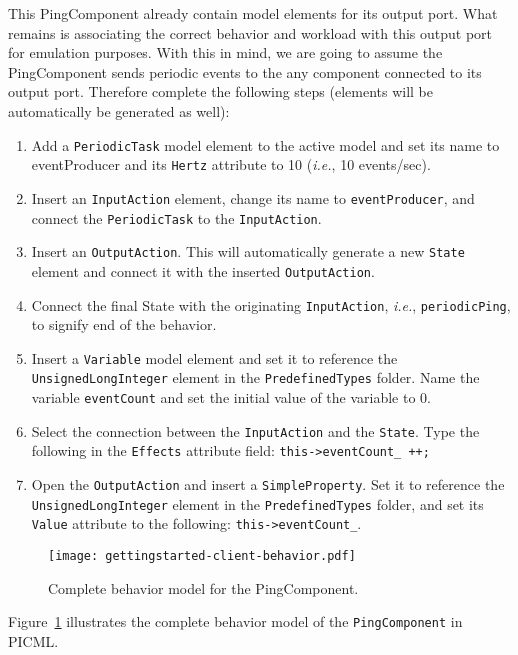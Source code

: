 This PingComponent already contain model elements for its output 
port. What remains is associating the correct behavior and workload 
with this output port for emulation purposes. With this in mind, 
we are going to assume the PingComponent sends periodic events to 
the any component connected to its output port. Therefore complete 
the following steps (elements will be automatically be generated 
as well):
\begin{enumerate}
  \item Add a \texttt{PeriodicTask} model element to the active model 
  and set its name to eventProducer and its \texttt{Hertz} attribute 
  to 10 (\textit{i.e.}, 10 events/sec).
    
  \item Insert an \texttt{InputAction} element, change its name to 
  \texttt{eventProducer}, and connect the \texttt{PeriodicTask} to 
  the \texttt{InputAction}.
    
  \item Insert an \texttt{OutputAction}. This will automatically 
  generate a new \texttt{State} element and connect it with the 
  inserted \texttt{OutputAction}.
    
  \item Connect the final State with the originating \texttt{InputAction}, 
  \textit{i.e.}, \texttt{periodicPing}, to signify end of the behavior.
    
  \item Insert a \texttt{Variable} model element and set it to reference 
  the \texttt{UnsignedLongInteger} element in the \texttt{PredefinedTypes} 
  folder. Name the variable \texttt{eventCount} and set the initial value 
  of the variable to 0.
    
  \item Select the connection between the \texttt{InputAction} and the 
  \texttt{State}. Type the following in the \texttt{Effects} attribute 
  field: \texttt{this->eventCount\_ ++;}
  
  \item Open the \texttt{OutputAction} and insert a \texttt{SimpleProperty}. 
  Set it to reference the \texttt{Un\-sign\-ed\-Long\-Integer} element in the 
  \texttt{PredefinedTypes} folder, and set its \texttt{Value} attribute 
  to the following: \texttt{this->eventCount\_}.
\end{enumerate}
\begin{figure}[htbp]
  \centering
  \texttt{[image: gettingstarted-client-behavior.pdf]}
  \caption{Complete behavior model for the PingComponent.}
  \label{fig:tutorial-behavior}
\end{figure}
Figure~\ref{fig:tutorial-behavior} illustrates the complete behavior 
model of the \texttt{PingComponent} in PICML.

